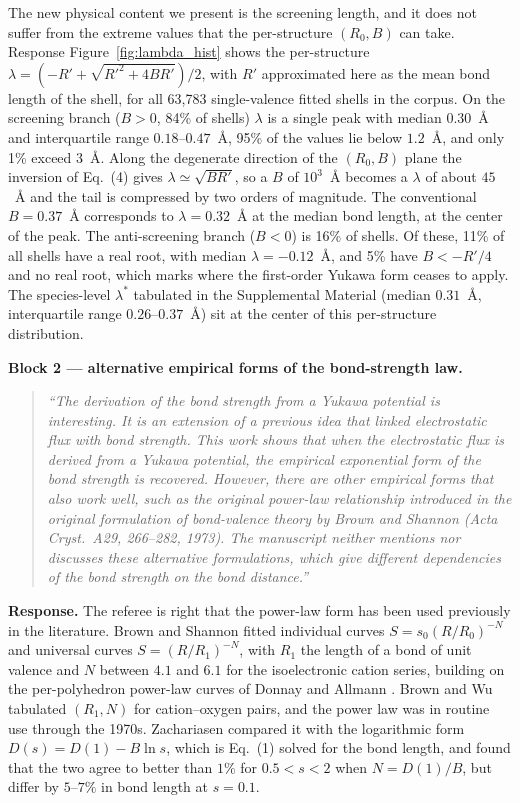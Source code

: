 \documentclass[11pt]{article}
\newenvironment{refquote}%
  {\begin{quote}\itshape\color{black!70}}%
  {\end{quote}}
\begin{document}
The new physical content we present is the screening length, and it
does not suffer from the extreme values that the per-structure
$(R_0,B)$ can take.  Response Figure~\ref{fig:lambda_hist} shows the
per-structure $\lambda=(-R'+\sqrt{R'^2+4BR'})/2$, with $R'$ approximated here 
as the mean bond length of the shell, for all 63{,}783 single-valence fitted
shells in the corpus.  On the screening branch ($B>0$, 84\% of
shells) $\lambda$ is a single peak with median $0.30$~\AA{} and
interquartile range $0.18$--$0.47$~\AA, 95\% of the values lie below
$1.2$~\AA, and only 1\% exceed $3$~\AA.  Along the degenerate
direction of the $(R_0,B)$ plane the inversion of Eq.~(4) gives
$\lambda\simeq\sqrt{BR'}$, so a $B$ of $10^{3}$~\AA{} becomes a
$\lambda$ of about $45$~\AA{} and the tail is compressed by two
orders of magnitude.  The conventional $B=0.37$~\AA{} corresponds to
$\lambda=0.32$~\AA{} at the median bond length, at the center of the
peak.  The anti-screening branch ($B<0$) is 16\% of shells.  Of these,
11\% of all shells have a real root, with median $\lambda=-0.12$~\AA,
and 5\% have $B<-R'/4$ and no real root, which marks where the
first-order Yukawa form ceases to apply.  The species-level
$\lambda^*$ tabulated in the Supplemental Material (median
$0.31$~\AA, interquartile range $0.26$--$0.37$~\AA) sit at the center
of this per-structure distribution.



\textbf{Block 2 --- alternative empirical forms of the bond-strength
law.}

\begin{refquote}
``The derivation of the bond strength from a Yukawa potential is
interesting.  It is an extension of a previous idea that linked
electrostatic flux with bond strength.  This work shows that when the
electrostatic flux is derived from a Yukawa potential, the empirical
exponential form of the bond strength is recovered.  However, there
are other empirical forms that also work well, such as the original
power-law relationship introduced in the original formulation of
bond-valence theory by Brown and Shannon (Acta Cryst.\ A29, 266--282,
1973).  The manuscript neither mentions nor discusses these
alternative formulations, which give different dependencies of the
bond strength on the bond distance.''
\end{refquote}

\textbf{Response.}  The referee is right that the power-law form has
been used previously in the literature. 
Brown and Shannon \cite{Brown1973} fitted individual
curves $S=s_0(R/R_0)^{-N}$ and universal curves $S=(R/R_1)^{-N}$,
with $R_1$ the length of a bond of unit valence and $N$ between
$4.1$ and $6.1$ for the isoelectronic cation series, building on the
per-polyhedron power-law curves of Donnay and Allmann
\cite{Donnay1970}.  Brown and Wu \cite{Brown1976} tabulated
$(R_1,N)$ for cation--oxygen pairs, and the power law was in routine
use through the 1970s.  Zachariasen \cite{Zachariasen1978} compared
it with the logarithmic form $D(s)=D(1)-B\ln s$, which is Eq.~(1)
solved for the bond length, and found that the two agree to better
than $1\%$ for $0.5<s<2$ when $N=D(1)/B$, but differ by $5$--$7\%$
in bond length at $s=0.1$.
\end{document}
